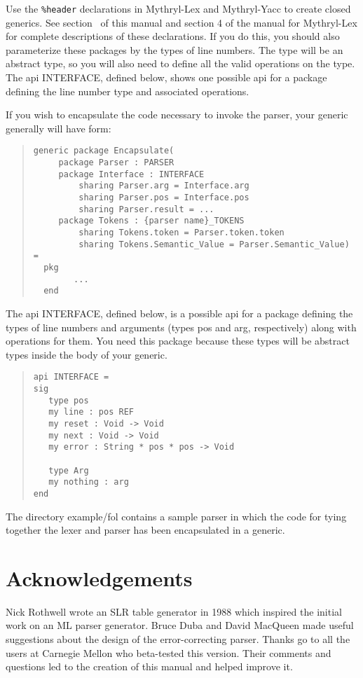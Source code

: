 Use the {\tt \%header} declarations in Mythryl-Lex and Mythryl-Yacc to create
closed generics.  See section~ of this manual
and section 4 of the manual for Mythryl-Lex for complete descriptions of these
declarations.  If you do this, you should also parameterize these
packages by the types of line numbers.  The type will be an
abstract type, so you will also need to define all the valid
operations on the type.  The api INTERFACE, defined below,
shows one possible api for a package defining the line
number type and associated operations.

If you wish to encapsulate the code necessary to invoke the
parser, your generic generally will have form:
\begin{quote}
\begin{verbatim}
generic package Encapsulate(
     package Parser : PARSER
     package Interface : INTERFACE
         sharing Parser.arg = Interface.arg
         sharing Parser.pos = Interface.pos
         sharing Parser.result = ...
     package Tokens : {parser name}_TOKENS
         sharing Tokens.token = Parser.token.token
         sharing Tokens.Semantic_Value = Parser.Semantic_Value) =
  pkg
        ...
  end
\end{verbatim}
\end{quote}

The api INTERFACE, defined below, is a possible api for
a package
defining the types
of line numbers and arguments (types pos and arg, respectively)
along with operations for them.  You need this package
because
these types will be abstract types inside the body of your
generic.
\begin{quote}
\begin{verbatim}
api INTERFACE = 
sig
   type pos
   my line : pos REF
   my reset : Void -> Void
   my next : Void -> Void
   my error : String * pos * pos -> Void

   type Arg
   my nothing : arg
end
\end{verbatim}
\end{quote}

The directory example/fol contains a sample parser in which
the code for tying together the lexer and parser has been
encapsulated in a generic.

\section{Acknowledgements}

Nick Rothwell wrote an SLR table generator in 1988 which inspired the
initial work on an ML parser generator.  Bruce Duba and David
MacQueen made useful suggestions about the design of the error-correcting
parser.  Thanks go to all the users at Carnegie Mellon who beta-tested
this version.  Their comments and questions led to the creation of
this manual and helped improve it.

